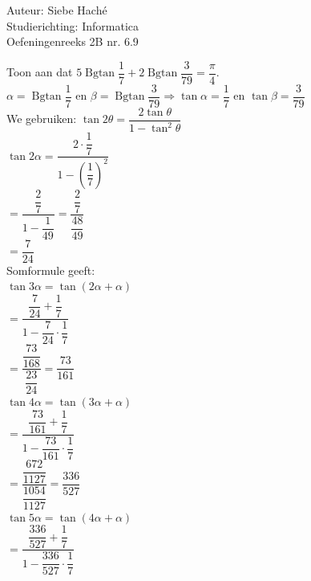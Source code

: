 \documentclass[a4paper]{article}
\begin{document}
\noindent \large Auteur: Siebe Haché \\
\noindent \large Studierichting: Informatica\\
\noindent \large Oefeningenreeks 2B nr. 6.9\\

\newcommand{\Bgtan}{\operatorname{Bgtan}}
\medskip
\normalsize

Toon aan dat $5\Bgtan\dfrac{1}{7} + 2\Bgtan\dfrac{3}{79} = \dfrac{\pi}{4}$. \\

$\alpha = \Bgtan\dfrac{1}{7}$ en $\beta = \Bgtan\dfrac{3}{79} \Rightarrow \tan \alpha = \dfrac{1}{7}$ en $\tan \beta = \dfrac{3}{79}$ \\

We gebruiken: $\tan 2\theta = \dfrac{2\tan\theta}{1-\tan^2\theta}$ \\

$\tan 2\alpha = \dfrac{2\cdot\dfrac{1}{7}}{1-\left(\dfrac{1}{7}\right)^2}$\\

$= \dfrac{\dfrac{2}{7}}{1-\dfrac{1}{49}} = \dfrac{\dfrac{2}{7}}{\dfrac{48}{49}}$ \\

$= \dfrac{7}{24}$ \\

Somformule geeft: \\

$\tan 3\alpha = \tan(2\alpha + \alpha)$ \\

$= \dfrac{\dfrac{7}{24} + \dfrac{1}{7}}{1 - \dfrac{7}{24}\cdot\dfrac{1}{7}}$ \\

$= \dfrac{\dfrac{73}{168}}{\dfrac{23}{24}} = \dfrac{73}{161}$\\

$\tan 4\alpha = \tan(3\alpha + \alpha)$ \\

$= \dfrac{\dfrac{73}{161} + \dfrac{1}{7}}{1 - \dfrac{73}{161}\cdot\dfrac{1}{7}}$ \\

$= \dfrac{\dfrac{672}{1127}}{\dfrac{1054}{1127}} = \dfrac{336}{527}$ \\

$\tan 5\alpha = \tan(4\alpha + \alpha)$ \\

$= \dfrac{\dfrac{336}{527} + \dfrac{1}{7}}{1 - \dfrac{336}{527}\cdot\dfrac{1}{7}}$ \\
\end{document}
